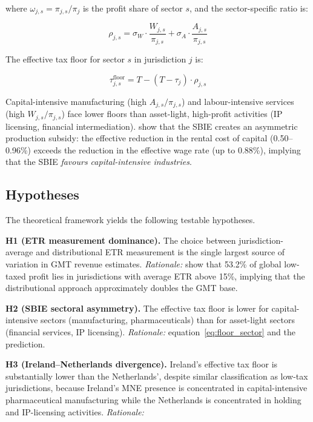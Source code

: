 \documentclass[11pt,a4paper]{article}
\begin{document}
where $\omega_{j,s} = \pi_{j,s} / \pi_j$ is the profit share of sector $s$, and the sector-specific ratio is:

\begin{equation}\label{eq:rho_sector}
\rho_{j,s} = \sigma_W \cdot \frac{W_{j,s}}{\pi_{j,s}} + \sigma_A \cdot \frac{A_{j,s}}{\pi_{j,s}}
\end{equation}

The effective tax floor for sector $s$ in jurisdiction $j$ is:

\begin{equation}\label{eq:floor_sector}
\tau_{j,s}^{\text{floor}} = T - (T - \tau_j) \cdot \rho_{j,s}
\end{equation}

Capital-intensive manufacturing (high $A_{j,s}/\pi_{j,s}$) and labour-intensive services (high $W_{j,s}/\pi_{j,s}$) face lower floors than asset-light, high-profit activities (IP licensing, financial intermediation). \citet{schjelderup2024} show that the SBIE creates an asymmetric production subsidy: the effective reduction in the rental cost of capital (0.50--0.96\%) exceeds the reduction in the effective wage rate (up to 0.88\%), implying that the SBIE \emph{favours capital-intensive industries}.

\subsection{Hypotheses}\label{sec:hypotheses}

The theoretical framework yields the following testable hypotheses.

\textbf{H1 (ETR measurement dominance).} The choice between jurisdiction-average and distributional ETR measurement is the single largest source of variation in GMT revenue estimates. \emph{Rationale:} \citet{hugger2026} show that 53.2\% of global low-taxed profit lies in jurisdictions with average ETR above 15\%, implying that the distributional approach approximately doubles the GMT base.

\textbf{H2 (SBIE sectoral asymmetry).} The effective tax floor is lower for capital-intensive sectors (manufacturing, pharmaceuticals) than for asset-light sectors (financial services, IP licensing). \emph{Rationale:} equation~\eqref{eq:floor_sector} and the \citet{schjelderup2024} prediction.

\textbf{H3 (Ireland--Netherlands divergence).} Ireland's effective tax floor is substantially lower than the Netherlands', despite similar classification as low-tax jurisdictions, because Ireland's MNE presence is concentrated in capital-intensive pharmaceutical manufacturing while the Netherlands is concentrated in holding and IP-licensing activities. \emph{Rationale:}
\end{document}

